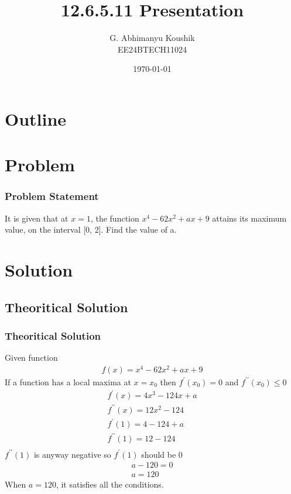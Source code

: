 \documentclass{beamer}
\title{12.6.5.11 Presentation}
\author{G. Abhimanyu Koushik \\ EE24BTECH11024}
\date{\today}
\providecommand{\brak}[1]{\ensuremath{\left(#1\right)}}
\theoremstyle{remark}
\numberwithin{equation}{section}
\begin{document}
\begin{frame}
\titlepage
\end{frame}

\section*{Outline}
\begin{frame}
\tableofcontents
\end{frame}
\section{Problem}
\begin{frame}
\frametitle{Problem Statement}
%
It is given that at $x = 1$, the function $x^4 - 62x^2 + ax + 9$ attains its maximum value, on the interval [0, 2]. Find the value of a.
%
\end{frame}

\section{Solution}
\subsection{Theoritical Solution}
\begin{frame}
\frametitle{Theoritical Solution}
Given function
\begin{align}
	f\brak{x} = x^4 - 62x^2 + ax + 9
\end{align}
If a function has a local maxima at $x=x_0$ then $f^\prime\brak{x_0} = 0$ and $f^{\prime\prime}\brak{x_0} \le 0$
\begin{align}
	f^\prime\brak{x} = 4x^3 - 124x + a \\
	f^{\prime\prime}\brak{x} = 12x^2 - 124\\
	f^\prime\brak{1} = 4-124+a\\
	f^{\prime\prime}\brak{1} = 12 - 124\\
\end{align}
$f^{\prime\prime}\brak{1}$ is anyway negative so $f^\prime\brak{1}$ should be $0$
\begin{align}
	a-120 =0\\
	a = 120
\end{align}
When $a = 120$, it satisfies all the conditions.\\
\end{frame}
\end{document}
